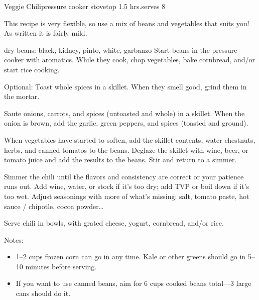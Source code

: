 \begin{recipe}{Veggie Chili}{pressure cooker \hfill stovetop \hfill 1.5 hrs.}{serves 8}

 \freeform This recipe is very flexible, so use a mix of beans and vegetables that suits you! As written it is fairly mild.

  {dry beans: black, kidney, pinto, white, garbanzo}
 Start beans in the pressure cooker with aromatics. While they cook, chop vegetables, bake cornbread, and/or start rice cooking.

 Optional: Toast whole spices in a skillet. When they smell good, grind them in the mortar.

 Saute onions, carrots, and spices (untoasted and whole) in a skillet. When the onion is brown, add the garlic, green peppers, and spices (toasted and ground).

 When vegetables have started to soften, add the skillet contents, water chestnuts, herbs, and canned tomatos to the beans. Deglaze the skillet with wine, beer, or tomato juice and add the results to the beans. Stir and return to a simmer.

 Simmer the chili until the flavors and consistency are correct or your patience runs out. Add wine, water, or stock if it's too dry; add TVP or boil down if it's too wet. Adjust seasonings with more of what's missing: salt, tomato paste, hot sauce / chipotle, cocoa powder\dots

 \newstep Serve chili in bowls, with grated cheese, yogurt, cornbread, and/or rice.

 \freeform Notes:
 \begin{itemize}
  \item 1--2 cups frozen corn can go in any time. Kale or other greens should go in 5--10 minutes before serving.
  \item If you want to use canned beans, aim for 6 cups cooked beans total---3 large cans should do it.
 \end{itemize}
\end{recipe}
